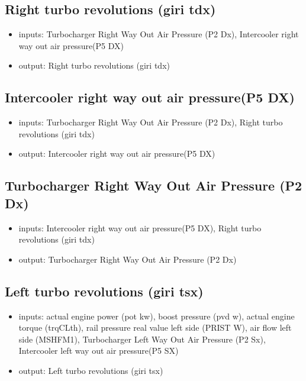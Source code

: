 


\subsection{Right turbo revolutions (giri tdx)}
\begin{itemize}
	\item{inputs: Turbocharger Right Way Out Air Pressure (P2 Dx), Intercooler right way out air pressure(P5 DX)}
	\item{output: Right turbo revolutions (giri tdx)}
\end{itemize}	




\subsection{Intercooler right way out air pressure(P5 DX)}
\begin{itemize}
	\item{inputs: Turbocharger Right Way Out Air Pressure (P2 Dx), Right turbo revolutions (giri tdx)}
	\item{output: Intercooler right way out air pressure(P5 DX)}
\end{itemize}	



\subsection{Turbocharger Right Way Out Air Pressure (P2 Dx)}
\begin{itemize}
	\item{inputs: Intercooler right way out air pressure(P5 DX), Right turbo revolutions (giri tdx)}
	\item{output: Turbocharger Right Way Out Air Pressure (P2 Dx)}
\end{itemize}	



\subsection{Left turbo revolutions (giri tsx)}
\begin{itemize}
	\item{inputs: actual engine power (pot kw), boost pressure (pvd w), actual engine torque (trqCLth), rail pressure real value left side (PRIST W), air flow left side (MSHFM1), Turbocharger Left Way Out Air Pressure (P2 Sx), Intercooler left way out air pressure(P5 SX)}
	\item{output: Left turbo revolutions (giri tsx)}
\end{itemize}	

